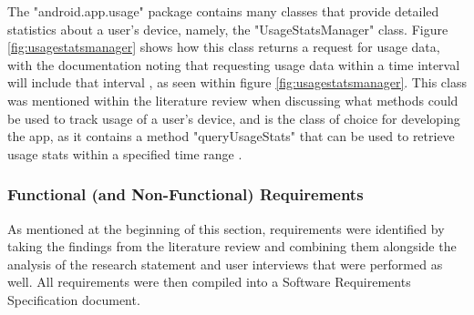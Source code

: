 \documentclass[12pt]{article}
\begin{document}
The "android.app.usage" package contains many classes that provide detailed statistics about a user's device, namely, the "UsageStatsManager" 
class. Figure \ref{fig:usagestatsmanager} shows how this class returns a request for usage data, with the documentation noting that requesting usage data within a time interval will include that
interval \autocite{androiddevelopment-usagestatsmanager}, as seen within figure \ref{fig:usagestatsmanager}. This class was mentioned within the literature review when discussing what methods could 
be used to track usage of a user's device, and is the class of choice for developing the app, as it contains a method "queryUsageStats" that can be used to retrieve usage stats within a specified 
time range \autocite{androiddevelopment-usagestatsmanager}.

\subsubsection{Functional (and Non-Functional) Requirements}

As mentioned at the beginning of this section, requirements were identified by taking the findings from the literature review and combining them alongside the analysis of the research statement and
user interviews that were performed as well. All requirements were then compiled into a Software Requirements Specification document.
\end{document}
